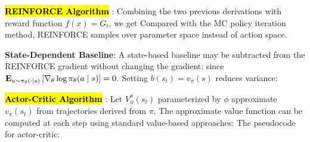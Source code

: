 \documentclass{article}
\begin{document}
  \hl{\textbf{REINFORCE Algorithm}} \cite{williams1992simple}: Combining the two previous derivations with reward function $f(x)=G_t$, we get
  Compared with the MC policy iteration method, REINFORCE samples over parameter space instead of action space. 

  \textbf{State-Dependent Baseline}: A state-based baseline may be subtracted from the REINFORCE gradient without changing the gradient:
  since $\mathbf{E}_{a\sim\pi_\theta(\cdot\mid s)}\left[ \nabla_\theta \log \pi_\theta(a\mid s)\right]=0$. Setting $b(s_t)=v_\pi(s)$ reduces variance:

  \hl{\textbf{Actor-Critic Algorithm}} \cite{sutton1999policy}: Let $V^\pi_\phi(s_t)$ parameterized by $\phi$ approximate $v_\pi(s_t)$ from trajectories derived from $\pi$. The approximate value function can be computed at each step using standard value-based approaches:
  The pseudocode for actor-critic:
\end{document}
